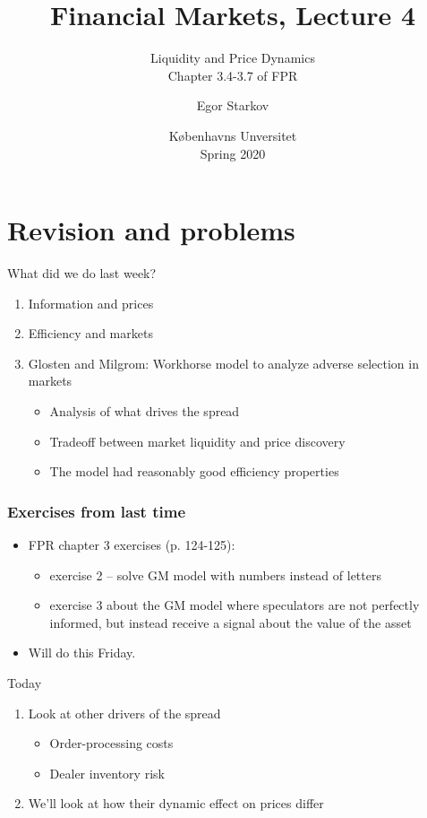 \documentclass[english,10pt]{beamer}
\title{Financial Markets, Lecture 4}
\subtitle{Liquidity and Price Dynamics\\
Chapter 3.4-3.7 of FPR}
\author{Egor Starkov}
\date{K{\o}benhavns Unversitet \\
	Spring 2020}
\begin{document}
	

\frame[plain]{\titlepage}


\section{Revision and problems}

\begin{frame}{What did we do last week?}
\begin{enumerate}
	\item Information and prices
	\item Efficiency and markets
	\item Glosten and Milgrom: Workhorse model to analyze adverse selection in markets
	\begin{itemize}
	\item Analysis of what drives the spread
	\item Tradeoff between market liquidity and price discovery
	\item The model had reasonably good efficiency properties
	\end{itemize}
\end{enumerate}
\end{frame}


\begin{frame}[label=exercises]
\frametitle{Exercises from last time}
\begin{itemize}
	\item FPR chapter 3 exercises (p. 124-125):
	\begin{itemize}
		\item exercise 2 -- solve GM model with numbers instead of letters
		\item exercise 3 about the GM model where speculators are not perfectly informed, but instead receive a signal about the value of the asset
	\end{itemize}
	\item Will do this Friday.
\end{itemize}
\end{frame}


\begin{frame}{Today}
\begin{enumerate}
	\item Look at other drivers of the spread
	\begin{itemize}
		\item Order-processing costs
		\item Dealer inventory risk
	\end{itemize}
	\item We'll look at how their dynamic effect on prices differ
\end{enumerate}
\end{frame}
\end{document}
